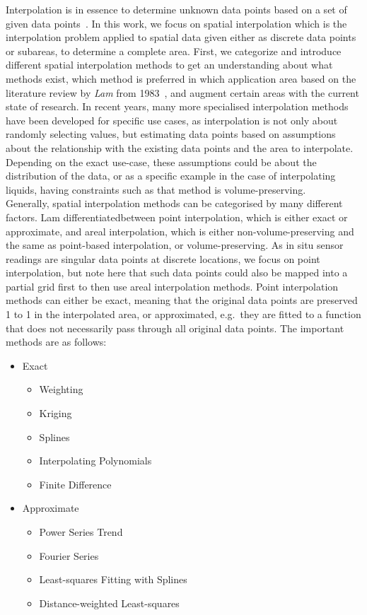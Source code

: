 Interpolation is in essence to determine unknown data points based on a set of given data points~\cite{steffensen1927interpolation}. In this work, we focus on spatial interpolation which is the interpolation problem applied to spatial data given either as discrete data points or subareas, to determine a complete area. First, we categorize and introduce different spatial interpolation methods to get an understanding about what methods exist, which method is preferred in which application area based on the literature review by \textit{Lam} from 1983~\cite{lam1983spatial}, and augment certain areas with the current state of research. In recent years, many more specialised interpolation methods have been developed for specific use cases, as interpolation is not only about randomly selecting values, but estimating data points based on assumptions about the relationship with the existing data points and the area to interpolate. Depending on the exact use-case, these assumptions could be about the distribution of the data, or as a specific example in the case of interpolating liquids, having constraints such as that method is volume-preserving.\\
Generally, spatial interpolation methods can be categorised by many different factors. Lam differentiatedbetween point interpolation, which is either exact or approximate, and areal interpolation, which is either non-volume-preserving and the same as point-based interpolation, or volume-preserving. As in situ sensor readings are singular data points at discrete locations, we focus on point interpolation, but note here that such data points could also be mapped into a partial grid first to then use areal interpolation methods.
Point interpolation methods can either be exact, meaning that the original data points are preserved 1 to 1 in the interpolated area, or approximated, e.g.\ they are fitted to a function that does not necessarily pass through all original data points. The important methods are as follows:

\begin{itemize}
    \item Exact

    \begin{itemize}
        \item Weighting
        \item Kriging
        \item Splines
        \item Interpolating Polynomials
        \item Finite Difference
    \end{itemize}

    \item Approximate

    \begin{itemize}
        \item Power Series Trend
        \item Fourier Series
        \item Least-squares Fitting with Splines
        \item Distance-weighted Least-squares
    \end{itemize}
\end{itemize}

